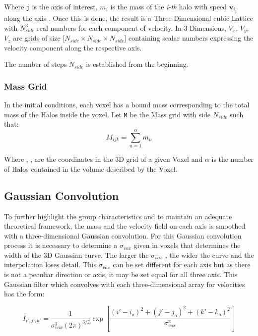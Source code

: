 \documentclass[a4paper,fleqn,usenatbib]{mnras}
\begin{document}
Where \texttt{j} is the axis of interest, $m_i$ is the mass of the \textit{i-th} halo with speed $\textbf{v}_{i_j}$ along the axis . Once this is done, the result is a Three-Dimensional cubic Lattice with $N_{side}^3$ real numbers for each component of velocity. In 3 Dimensions, $V_x$, $V_y$, $V_z$ are grids of size [$N_{side} \times N_{side} \times N_{side}$] containing scalar numbers expressing the velocity component along the respective axis.

The number of steps $N_{side}$ is established from the beginning.



\subsubsection{Mass Grid}
\label{sec:INTROMgrid}
In the initial conditions, each voxel has a bound mass corresponding to the total mass of the Halos inside the voxel. Let \texttt{M} be the \textbf{}{Mass grid} with side $N_{side}$ such that:
\begin{equation}
    M_{ijk}=\sum\limits_{n=1}^{\alpha} m_n 
\end{equation}

Where , ,  are the coordinates in the 3D grid of a given Voxel and $\alpha$ is the number of Halos contained in the volume described by the Voxel. 


\subsection{Gaussian Convolution}
\label{sec:INTROGCOnv}


To further highlight the group characteristics and to maintain an adequate theoretical framework, the mass and the velocity field on each axis is smoothed with a three-dimensional Gaussian convolution. For this Gaussian convolution process it is necessary to determine a $\sigma_{vox}$ given in voxels that determines the width of the 3D Gaussian curve. The larger the $\sigma_{vox}$ , the wider the curve and the interpolation loses detail. This $\sigma_{vox}$ can be set different for each axis but as there is not a peculiar direction or axis, it may be set equal for all three axis. This Gaussian filter which convolves with each three-dimensional array for velocities has the form:

\begin{equation}
    I_{i',j',k'}=\frac{1}{\sigma_{vox}^3 (2\pi)^{3/2}} \exp{ \left[ \frac{(i'-i_o)^2+(j'-j_o)^2+(k'-k_o)^2}{\sigma_{vox}^2}\right]}
\end{equation}
\end{document}
